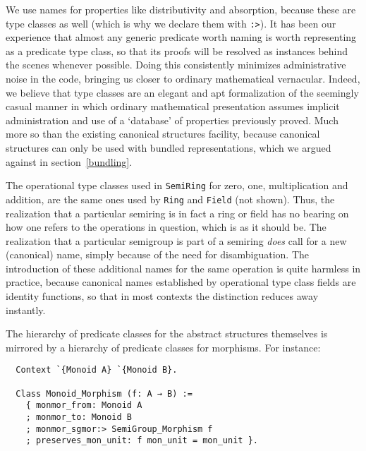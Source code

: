 \documentclass[a4paper,10pt,runningheads]{llncs}
\begin{document}

We use names for properties like distributivity and absorption, because these are type classes as well (which is why we declare them with \lstinline|:>|). It has been our experience that almost any generic predicate worth naming is worth representing as a predicate type class, so that its proofs will be resolved as instances behind the scenes whenever possible. Doing this consistently minimizes administrative noise in the code, bringing us closer to ordinary mathematical vernacular. Indeed, we believe that type classes are an elegant and apt formalization of the seemingly casual manner in which ordinary mathematical presentation assumes implicit administration and use of a `database' of properties previously proved. Much more so than the existing canonical structures facility, because canonical structures can only be used with bundled representations, which we argued against in section~\ref{bundling}.

The operational type classes used in \lstinline|SemiRing| for zero, one, multiplication and addition, are the same ones used by \lstinline|Ring| and \lstinline|Field| (not shown). Thus, the realization that a particular semiring is in fact a ring or field has no bearing on how one refers to the operations in question, which is as it should be. The realization that a particular semigroup is part of a semiring \emph{does} call for a new (canonical) name, simply because of the need for disambiguation. The introduction of these additional names for the same operation is quite harmless in practice, because canonical names established by operational type class fields are identity functions, so that in most contexts the distinction reduces away instantly.

The hierarchy of predicate classes for the abstract structures themselves is mirrored by a hierarchy of predicate classes for morphisms. For instance:
\begin{lstlisting}
  Context `{Monoid A} `{Monoid B}.

  Class Monoid_Morphism (f: A → B) :=
    { monmor_from: Monoid A
    ; monmor_to: Monoid B
    ; monmor_sgmor:> SemiGroup_Morphism f
    ; preserves_mon_unit: f mon_unit = mon_unit }.
\end{lstlisting}
\end{document}
